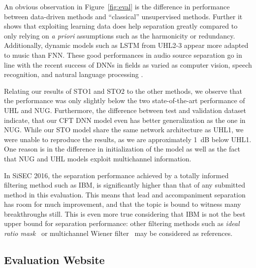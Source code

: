 An obvious observation in Figure~\ref{fig:eval} is the difference in performance between data-driven methods and ``classical'' unsupervised methods. 
Further it shows that exploiting learning data does help separation greatly compared to only relying on \textit{a priori} assumptions such as the harmonicity or redundancy. Additionally, dynamic models such as LSTM from UHL2-3 appear more adapted to music than FNN. 
These good performances in audio source separation go in line with the recent success of DNNs in fields as varied as computer vision, speech recognition, and natural language processing \cite{lecun15}.
\par
Relating our results of STO1 and STO2 to the other methods, we observe that the performance was only slightly below the two state-of-the-art performance of UHL and NUG.
Furthermore, the difference between test and validation dataset indicate, that our CFT DNN model even has better generalization as the one in NUG. 
While our STO model share the same network architecture as UHL1, we were unable to reproduce the results, as we are approximately 1~dB below UHL1.
One reason is in the difference in initialization of the model as well as the fact that NUG and UHL models exploit multichannel information. 
\par
In SiSEC 2016, the separation performance achieved by a totally informed filtering method such as IBM, is significantly higher than that of any submitted method in this evaluation. 
This means that lead and accompaniment separation has room for much improvement, and that the topic is bound to witness many breakthroughs still. 
This is even more true considering that IBM is not the best upper bound for separation performance: other filtering methods such as \textit{ideal ratio mask}~\cite{liutkus15c} or multichannel Wiener filter~\cite{duong10} may be considered as references.

\subsection{Evaluation Website}
\label{ssec:evaluation Website}

